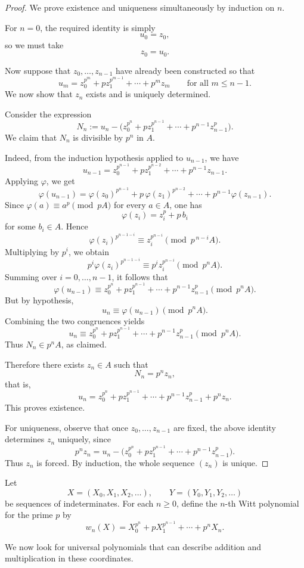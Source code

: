 \documentclass[oneside, a4paper, onecolumn, 11pt]{article}
\theoremstyle{definition}
\begin{document}
\begin{proof}

We prove existence and uniqueness simultaneously by induction on $n$.

For $n=0$, the required identity is simply
\[u_0=z_0,\]
so we must take
\[z_0=u_0.\]

Now suppose that $z_0,\dots,z_{n-1}$ have already been constructed so that
\[u_m=z_0^{p^m}+pz_1^{p^{m-1}}+\cdots+p^m z_m\qquad \text{for all } m\le n-1.\]
We now show that $z_n$ exists and is uniquely determined.

Consider the expression
\[N_n:=u_n-\bigl(z_0^{p^n}+pz_1^{p^{n-1}}+\cdots+p^{n-1}z_{n-1}^p\bigr).\]
We claim that $N_n$ is divisible by $p^n$ in $A$.

Indeed, from the induction hypothesis applied to $u_{n-1}$, we have
\[u_{n-1}=z_0^{p^{n-1}}+pz_1^{p^{n-2}}+\cdots+p^{n-1}z_{n-1}.\]
Applying $\varphi$, we get
\[\varphi(u_{n-1})=\varphi(z_0)^{p^{n-1}}+p\,\varphi(z_1)^{p^{n-2}}+\cdots+p^{n-1}\varphi(z_{n-1}).\]
Since $\varphi(a)\equiv a^p\pmod{pA}$ for every $a\in A$, one has
\[\varphi(z_i)=z_i^p+p\,b_i\]
for some $b_i\in A$.
Hence
\[\varphi(z_i)^{p^{n-1-i}}\equiv z_i^{p^{n-i}}\pmod{p^{\,n-i}A}.\]
Multiplying by $p^i$, we obtain
\[p^i\varphi(z_i)^{p^{n-1-i}} \equiv p^i z_i^{p^{n-i}}\pmod{p^n A}.\]
Summing over $i=0,\dots,n-1$, it follows that
\[\varphi(u_{n-1})\equiv z_0^{p^n}+pz_1^{p^{n-1}}+\cdots+p^{n-1}z_{n-1}^p\pmod{p^nA}.\]
But by hypothesis,
\[u_n\equiv \varphi(u_{n-1})\pmod{p^nA}.\]
Combining the two congruences yields
\[u_n\equiv z_0^{p^n}+pz_1^{p^{n-1}}+\cdots+p^{n-1}z_{n-1}^p\pmod{p^nA}.\]
Thus $N_n\in p^nA$, as claimed.

Therefore there exists $z_n\in A$ such that
\[N_n=p^n z_n,\]
that is,
\[u_n=z_0^{p^n}+pz_1^{p^{n-1}}+\cdots+p^{n-1}z_{n-1}^p+p^n z_n.\]
This proves existence.

For uniqueness, observe that once $z_0,\dots,z_{n-1}$ are fixed, the above identity determines $z_n$ uniquely, since
\[p^n z_n=u_n-\bigl(z_0^{p^n}+pz_1^{p^{n-1}}+\cdots+p^{n-1}z_{n-1}^p\bigr).\]
Thus $z_n$ is forced. By induction, the whole sequence $(z_n)$ is unique.
\end{proof}

Let
\[X=(X_0,X_1,X_2,\ldots), \qquad Y=(Y_0,Y_1,Y_2,\ldots)\]
be sequences of indeterminates. For each $n\geq 0$, define the $n$-th Witt polynomial for the prime $p$ by
\[w_n(X)=X_0^{p^n}+pX_1^{p^{n-1}}+\cdots+p^nX_n.\]

We now look for universal polynomials that can describe addition and multiplication in these coordinates.
\end{document}
